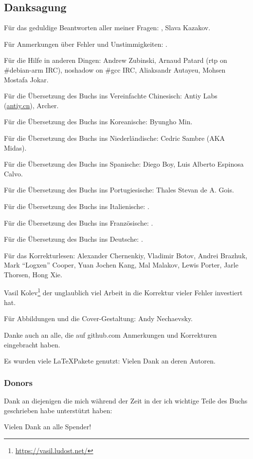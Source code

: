 \subsection*{Danksagung}

Für das geduldige Beantworten aller meiner Fragen: \HERMIT, Slava  Kazakov.

Für Anmerkungen über Fehler und Unstimmigkeiten: \PeopleMistakesInaccuracies{}.

Für die Hilfe in anderen Dingen:
Andrew Zubinski,
Arnaud Patard (rtp on \#debian-arm IRC),
noshadow on \#gcc IRC,
Aliaksandr Autayeu,
Mohsen Mostafa Jokar.

Für die Übersetzung des Buchs ins Vereinfachte Chinesisch:
Antiy Labs (\href{http://antiy.cn}{antiy.cn}), Archer.

Für die Übersetzung des Buchs ins Koreanische: Byungho Min.

Für die Übersetzung des Buchs ins Niederländische: Cedric Sambre (AKA Midas).

Für die Übersetzung des Buchs ins Spanische: Diego Boy, Luis Alberto Espinosa Calvo.

Für die Übersetzung des Buchs ins Portugiesische: Thales Stevan de A. Gois.

Für die Übersetzung des Buchs ins Italienische: \PeopleItalianTranslators{}.

Für die Übersetzung des Buchs ins Französische: \PeopleFrenchTranslators{}.

Für die Übersetzung des Buchs ins Deutsche: \PeopleGermanTranslators{}.

Für das Korrekturlesen:
Alexander  Chernenkiy,
Vladimir Botov,
Andrei Brazhuk,
Mark ``Logxen'' Cooper, Yuan Jochen Kang, Mal Malakov, Lewis Porter, Jarle Thorsen, Hong Xie.

Vasil Kolev\footnote{\url{https://vasil.ludost.net/}} der unglaublich viel Arbeit in die Korrektur vieler Fehler investiert hat.

Für Abbildungen und die Cover-Gestaltung: Andy Nechaevsky.

Danke auch an alle, die auf github.com Anmerkungen und Korrekturen eingebracht haben.

Es wurden viele \LaTeX\-Pakete genutzt: Vielen Dank an deren Autoren.

\subsubsection*{Donors}

Dank an diejenigen die mich während der Zeit in der ich wichtige Teile des Buchs geschrieben habe
unterstützt haben:



Vielen Dank an alle Spender!
